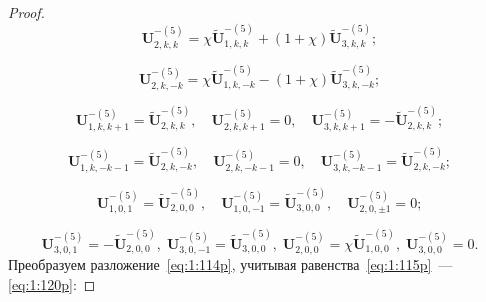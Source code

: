 \begin{russian}
\begin{proof}
\begin{equation}
\mathbf{U}_{2,k,k}^{-(5)}=\chi\mathbf{\tilde U}_{1,k,k}^{-(5)}+(1+\chi)\mathbf{\tilde U}_{3,k,k}^{-(5)};
\label{eq:1:115p}
\end{equation}

\begin{equation}
\mathbf{U}_{2,k,-k}^{-(5)}=\chi\mathbf{\tilde U}_{1,k,-k}^{-(5)}-(1+\chi)\mathbf{\tilde U}_{3,k,-k}^{-(5)};
\label{eq:1:116p}
\end{equation}

\begin{equation}
\mathbf{U}_{1,k,k+1}^{-(5)}=\mathbf{\tilde U}_{2,k,k}^{-(5)},\quad\mathbf{U}_{2,k,k+1}^{-(5)}=0,\quad\mathbf{U}_{3,k,k+1}^{-(5)}=-\mathbf{\tilde U}_{2,k,k}^{-(5)};
\label{eq:1:117p}
\end{equation}

\begin{equation}
\mathbf{U}_{1,k,-k-1}^{-(5)}=\mathbf{\tilde U}_{2,k,-k}^{-(5)},\quad\mathbf{U}_{2,k,-k-1}^{-(5)}=0,\quad\mathbf{U}_{3,k,-k-1}^{-(5)}=\mathbf{\tilde U}_{2,k,-k}^{-(5)};
\label{eq:1:118p}
\end{equation}

\begin{equation}
\mathbf{U}_{1,0,1}^{-(5)}=\mathbf{\tilde U}_{2,0,0}^{-(5)},\quad\mathbf{U}_{1,0,-1}^{-(5)}=\mathbf{\tilde U}_{3,0,0}^{-(5)},\quad\mathbf{U}_{2,0,\pm 1}^{-(5)}=0;
\label{eq:1:119p}
\end{equation}

\begin{equation}
\mathbf{U}_{3,0,1}^{-(5)}=-\mathbf{\tilde U}_{2,0,0}^{-(5)},\;\mathbf{U}_{3,0,-1}^{-(5)}=\mathbf{\tilde U}_{3,0,0}^{-(5)},\;\mathbf{U}_{2,0,0}^{-(5)}=\chi\mathbf{\tilde U}_{1,0,0}^{-(5)},\;\mathbf{U}_{3,0,0}^{-(5)}=0.
\label{eq:1:120p}
\end{equation}
Преобразуем разложение~\eqref{eq:1:114p}, учитывая равенства~\eqref{eq:1:115p}~--- \eqref{eq:1:120p}:


\end{proof}
\end{russian}
